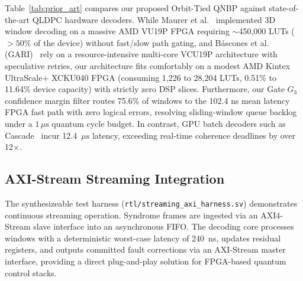 \documentclass[journal]{IEEEtran}
\begin{document}


Table~\ref{tab:prior_art} compares our proposed Orbit-Tied QNBP against state-of-the-art QLDPC hardware decoders. While Maurer et al.~\cite{maurer2025fpga} implemented 3D window decoding on a massive AMD VU19P FPGA requiring $\sim$450,000 LUTs ($>50\%$ of the device) without fast/slow path gating, and B{\'a}scones et al. (GARI)~\cite{cowtan2024modular} rely on a resource-intensive multi-core VCU19P architecture with speculative retries, our architecture fits comfortably on a modest AMD Kintex UltraScale+ XCKU040 FPGA (consuming 1,226 to 28,204 LUTs, 0.51\% to 11.64\% device capacity) with strictly zero DSP slices. Furthermore, our Gate $G_3$ confidence margin filter routes 75.6\% of windows to the 102.4 ns mean latency FPGA fast path with zero logical errors, resolving sliding-window queue backlog under a $1\,\mu\text{s}$ quantum cycle budget. In contrast, GPU batch decoders such as Cascade~\cite{gu2026cascade} incur 12.4~$\mu\text{s}$ latency, exceeding real-time coherence deadlines by over 12$\times$.

\subsection{AXI-Stream Streaming Integration}
The synthesizeable test harness (\texttt{rtl/streaming\_axi\_harness.sv}) demonstrates continuous streaming operation. Syndrome frames are ingested via an AXI4-Stream slave interface into an asynchronous FIFO. The decoding core processes windows with a deterministic worst-case latency of 240~ns, updates residual registers, and outputs committed fault corrections via an AXI-Stream master interface, providing a direct plug-and-play solution for FPGA-based quantum control stacks.
\end{document}
